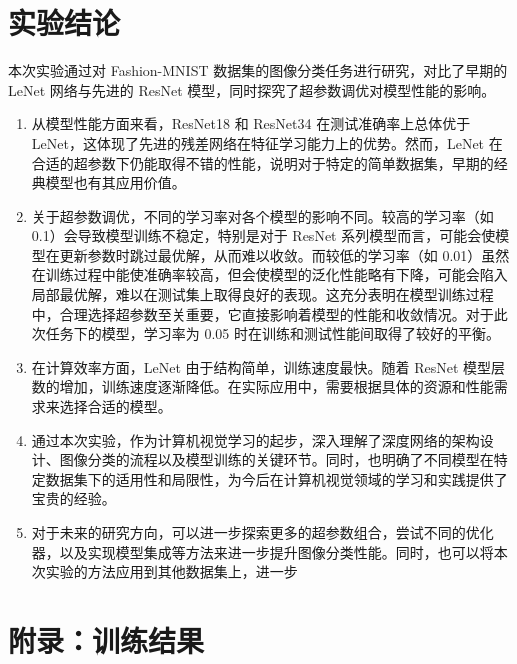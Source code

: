\documentclass[UTF8]{ctexart}
\begin{document}
\section{实验结论}

本次实验通过对 Fashion-MNIST 数据集的图像分类任务进行研究，对比了早期的 LeNet 网络与先进的 ResNet 模型，同时探究了超参数调优对模型性能的影响。
\begin{enumerate}
    \item 从模型性能方面来看，ResNet18 和 ResNet34 在测试准确率上总体优于 LeNet，这体现了先进的残差网络在特征学习能力上的优势。然而，LeNet 在合适的超参数下仍能取得不错的性能，说明对于特定的简单数据集，早期的经典模型也有其应用价值。
    \item 关于超参数调优，不同的学习率对各个模型的影响不同。较高的学习率（如 0.1）会导致模型训练不稳定，特别是对于 ResNet 系列模型而言，可能会使模型在更新参数时跳过最优解，从而难以收敛。而较低的学习率（如 0.01）虽然在训练过程中能使准确率较高，但会使模型的泛化性能略有下降，可能会陷入局部最优解，难以在测试集上取得良好的表现。这充分表明在模型训练过程中，合理选择超参数至关重要，它直接影响着模型的性能和收敛情况。对于此次任务下的模型，学习率为 0.05 时在训练和测试性能间取得了较好的平衡。
    \item 在计算效率方面，LeNet 由于结构简单，训练速度最快。随着 ResNet 模型层数的增加，训练速度逐渐降低。在实际应用中，需要根据具体的资源和性能需求来选择合适的模型。
    \item 通过本次实验，作为计算机视觉学习的起步，深入理解了深度网络的架构设计、图像分类的流程以及模型训练的关键环节。同时，也明确了不同模型在特定数据集下的适用性和局限性，为今后在计算机视觉领域的学习和实践提供了宝贵的经验。
    \item 对于未来的研究方向，可以进一步探索更多的超参数组合，尝试不同的优化器，以及实现模型集成等方法来进一步提升图像分类性能。同时，也可以将本次实验的方法应用到其他数据集上，进一步
\end{enumerate}

\newpage
\section{附录：训练结果}
\end{document}

